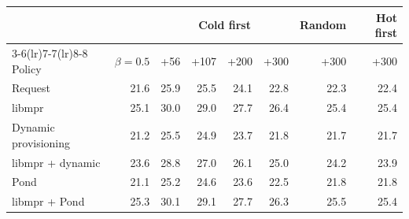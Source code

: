 \begin{tabular}{lrrrrrrr}
\toprule
 & & \multicolumn{4}{c}{Cold first} & Random & Hot first \\
\cmidrule(lr){3-6}\cmidrule(lr){7-7}\cmidrule(lr){8-8}
Policy & $\beta = 0.5$ & +56 & +107 & +200 & +300 & +300 & +300 \\
\midrule
Request & 21.6 & 25.9 & 25.5 & 24.1 & 22.8 & 22.3 & 22.4 \\
libmpr & 25.1 & 30.0 & 29.0 & 27.7 & 26.4 & 25.4 & 25.4 \\
Dynamic provisioning & 21.2 & 25.5 & 24.9 & 23.7 & 21.8 & 21.7 & 21.7 \\
libmpr + dynamic & 23.6 & 28.8 & 27.0 & 26.1 & 25.0 & 24.2 & 23.9 \\
Pond & 21.1 & 25.2 & 24.6 & 23.6 & 22.5 & 21.8 & 21.8 \\
libmpr + Pond & 25.3 & 30.1 & 29.1 & 27.7 & 26.3 & 25.5 & 25.4 \\
\bottomrule
\end{tabular}
